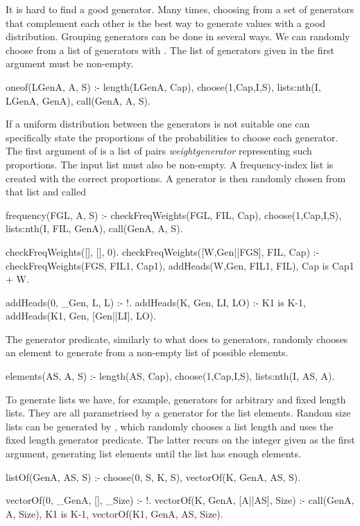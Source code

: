 It is hard to find a good generator.
%
Many times, choosing from a set of generators that complement each other
is the best way to generate values with a good distribution.
%
Grouping generators can be done in several ways.
%
We can randomly choose from a list of generators with .
%
The list of generators given in the first argument must be non-empty.
%
\begin{yapcode}
 oneof(LGenA, A, S) :-
   length(LGenA, Cap),
   choose(1,Cap,I,S),
   lists:nth(I, LGenA, GenA),
   call(GenA, A, S).
\end{yapcode}
%
If a uniform distribution between the generators is not suitable one can
specifically state the proportions of the probabilities to choose each
generator.
%
The first argument of  is a list of pairs
\yap{\{}\emph{weight}\yap{,}\emph{generator}\yap{\}} representing such
proportions.
%
The input list must also be non-empty.
%
A frequency-index list is created with the correct proportions.
%
A generator is then randomly chosen from that list and called
\begin{yapcode}
 frequency(FGL, A, S) :-
   checkFreqWeights(FGL, FIL, Cap),
   choose(1,Cap,I,S),
   lists:nth(I, FIL, GenA),
   call(GenA, A, S).

 checkFreqWeights([], [], 0).
 checkFreqWeights([{W,Gen}||FGS], FIL, Cap) :-
   checkFreqWeights(FGS, FIL1, Cap1),
   addHeads(W,Gen, FIL1, FIL),
   Cap is Cap1 + W.

 addHeads(0, _Gen, L, L) :- !.
 addHeads(K, Gen, LI, LO) :-
   K1 is K-1,
   addHeads(K1, Gen, [Gen||LI], LO).
\end{yapcode}


The  generator predicate, similarly to what
 does to generators, randomly chooses an element to
generate from a non-empty list of possible elements.
%
\begin{yapcode}
 elements(AS, A, S) :-
   length(AS, Cap),
   choose(1,Cap,I,S),
   lists:nth(I, AS, A).
\end{yapcode}



To generate lists we have, for example, generators for arbitrary and
fixed length lists.
%
They are all parametrised by a generator for the list elements.
%
Random size lists can be generated by , which randomly
chooses a list length and uses the  fixed length
generator predicate.
%
The latter recurs on the integer given as the first argument, generating
list elements until the list has enough elements.
\begin{yapcode}
 listOf(GenA, AS, S) :-
   choose(0, S, K, S),
   vectorOf(K, GenA, AS, S).

 vectorOf(0, _GenA, [], _Size) :- !.
 vectorOf(K, GenA, [A||AS], Size) :-
   call(GenA, A, Size),
   K1 is K-1,
   vectorOf(K1, GenA, AS, Size).
\end{yapcode}


